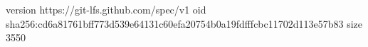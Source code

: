 version https://git-lfs.github.com/spec/v1
oid sha256:cd6a81761bff773d539e64131c60efa20754b0a19fdfffcbc11702d113e57b83
size 3550
